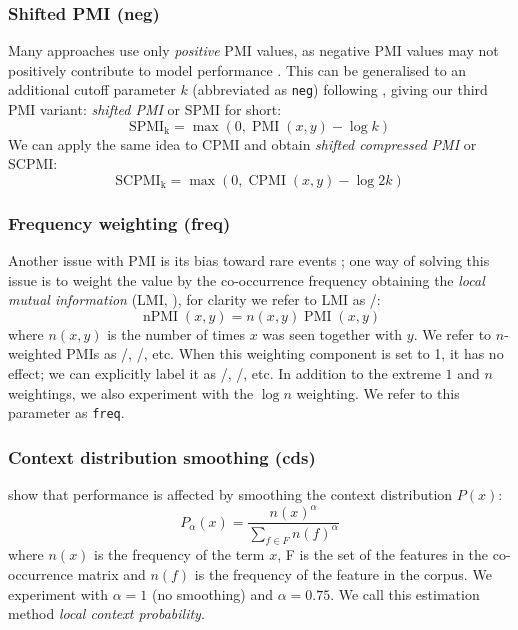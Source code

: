 \subsubsection{Shifted PMI (neg)}
\label{sec:shifted-pmi}

Many approaches use only \emph{positive} PMI values, as  negative PMI values may not positively contribute to model performance \cite{Turney:2010:FMV:1861751.1861756}. This can be generalised to an additional cutoff parameter $k$ (abbreviated as \texttt{neg}) following , giving our third PMI variant: \emph{shifted PMI} or SPMI for short:
%
\begin{equation}
  \label{eq:ppmi}
  \operatorname{SPMI_k} = \max (0, \operatorname{PMI}(x, y) - \log k)
\end{equation}
%
We can apply the same idea to CPMI and obtain \emph{shifted compressed PMI} or SCPMI:
%
\begin{equation}
  \label{eq:pcpmi}
  \operatorname{SCPMI_k} = \max (0, \operatorname{CPMI}(x, y) - \log 2k)
\end{equation}

\subsubsection{Frequency weighting (freq)}
\label{sec:frequency-weighting}

Another issue with PMI is its bias toward rare events \cite{TACL570}; one way of solving this issue is to weight the value by the co-occurrence frequency obtaining the \emph{local mutual information} (LMI, ), for clarity we refer to LMI as \NPMI/:
%
\begin{equation}
  \label{eq:lmi}
  \operatorname{nPMI}(x, y) = n(x, y)\operatorname{PMI}(x, y)
\end{equation}
%
where $n(x, y)$ is the number of times $x$ was seen together with $y$. We refer to $n$-weighted PMIs as \NPMI/, \NSPMI/, etc. When this weighting component is set to 1, it has no effect; we can explicitly label it as \PMI/, \SPMI/, etc. In addition to the extreme $1$ and $n$ weightings, we also experiment with the $\log n$ weighting. We refer to this parameter as \texttt{freq}.

\subsubsection{Context distribution smoothing (cds)}
\label{sec:cont-distr-smooth}

 show that performance is affected by smoothing the context distribution $P(x)$:
%
\begin{equation}
  \label{eq:cds}
  P_{\alpha}(x) = \frac{n(x)^{\alpha}}{\sum_{f \in F}n(f)^{\alpha}}
\end{equation}
where $n(x)$ is the frequency of the term $x$, F is the set of the features in the co-occurrence matrix and $n(f)$ is the frequency of the feature in the corpus. We experiment with $\alpha=1$ (no smoothing) and $\alpha = 0.75$. We call this estimation method \emph{local context probability}.

